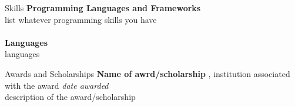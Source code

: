 \documentclass{resume} %
\begin{document}
\begin{rSection}{Skills}
{\bf Programming Languages and Frameworks }
\\list whatever programming skills you have\\\\
{\bf Languages}
\\languages
\end{rSection}



\begin{rSection}{Awards and Scholarships} 
{\bf Name of awrd/scholarship}{ , institution associated with the award
} \hfill{\em date awarded}
\\description of the award/scholarship\\

\end{rSection}
\end{document}

